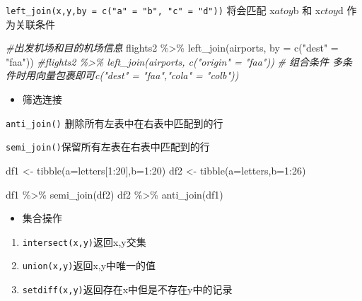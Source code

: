\documentclass[
]{book}
\newenvironment{Shaded}{\begin{snugshade}}{\end{snugshade}}
\newcommand{\AttributeTok}[1]{\textcolor[rgb]{0.77,0.63,0.00}{#1}}
\newcommand{\CommentTok}[1]{\textcolor[rgb]{0.56,0.35,0.01}{\textit{#1}}}
\newcommand{\DecValTok}[1]{\textcolor[rgb]{0.00,0.00,0.81}{#1}}
\newcommand{\FunctionTok}[1]{\textcolor[rgb]{0.00,0.00,0.00}{#1}}
\newcommand{\NormalTok}[1]{#1}
\newcommand{\OtherTok}[1]{\textcolor[rgb]{0.56,0.35,0.01}{#1}}
\newcommand{\SpecialCharTok}[1]{\textcolor[rgb]{0.00,0.00,0.00}{#1}}
\newcommand{\StringTok}[1]{\textcolor[rgb]{0.31,0.60,0.02}{#1}}
\providecommand{\tightlist}{%
  \setlength{\itemsep}{0pt}\setlength{\parskip}{0pt}}
\begin{document}
\texttt{left\_join(x,y,by\ =\ c("a"\ =\ "b",\ "c"\ =\ "d"))} 将会匹配 x\(a to y\)b 和 x\(c to y\)d 作为关联条件

\begin{Shaded}
\begin{Highlighting}[]
\CommentTok{\#出发机场和目的机场信息}
\NormalTok{flights2 }\SpecialCharTok{\%\textgreater{}\%} \FunctionTok{left\_join}\NormalTok{(airports, }\AttributeTok{by =} \FunctionTok{c}\NormalTok{(}\StringTok{"dest"} \OtherTok{=} \StringTok{"faa"}\NormalTok{))}
\CommentTok{\#flights2 \%\textgreater{}\% left\_join(airports, c("origin" = "faa"))}
\CommentTok{\# 组合条件 多条件时用向量包裹即可c("dest" = "faa","cola" = "colb"))}
\end{Highlighting}
\end{Shaded}

\begin{itemize}
\tightlist
\item
  筛选连接
\end{itemize}

\texttt{anti\_join()} 删除所有左表中在右表中匹配到的行

\texttt{semi\_join()}保留所有左表在右表中匹配到的行

\begin{Shaded}
\begin{Highlighting}[]
\NormalTok{df1 }\OtherTok{\textless{}{-}} \FunctionTok{tibble}\NormalTok{(}\AttributeTok{a=}\NormalTok{letters[}\DecValTok{1}\SpecialCharTok{:}\DecValTok{20}\NormalTok{],}\AttributeTok{b=}\DecValTok{1}\SpecialCharTok{:}\DecValTok{20}\NormalTok{)}
\NormalTok{df2 }\OtherTok{\textless{}{-}} \FunctionTok{tibble}\NormalTok{(}\AttributeTok{a=}\NormalTok{letters,}\AttributeTok{b=}\DecValTok{1}\SpecialCharTok{:}\DecValTok{26}\NormalTok{)}

\NormalTok{df1 }\SpecialCharTok{\%\textgreater{}\%} \FunctionTok{semi\_join}\NormalTok{(df2)}
\NormalTok{df2 }\SpecialCharTok{\%\textgreater{}\%} \FunctionTok{anti\_join}\NormalTok{(df1)}
\end{Highlighting}
\end{Shaded}

\begin{itemize}
\tightlist
\item
  集合操作
\end{itemize}

\begin{enumerate}
\def\labelenumi{\arabic{enumi}.}
\item
  \texttt{intersect(x,y)}返回x,y交集
\item
  \texttt{union(x,y)}返回x,y中唯一的值
\item
  \texttt{setdiff(x,y)}返回存在x中但是不存在y中的记录
\end{enumerate}
\end{document}
